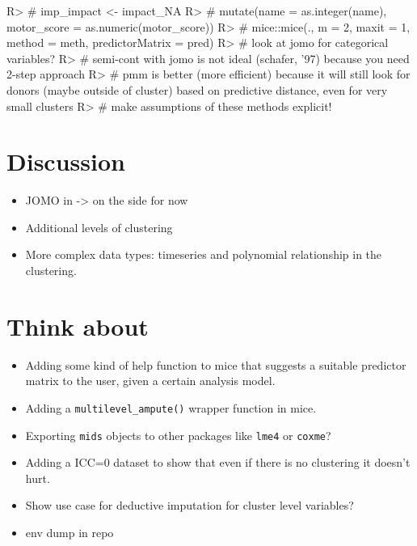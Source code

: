 \documentclass[
]{jss}
\begin{document}
\begin{CodeChunk}
\begin{CodeInput}
R> # imp_impact <- impact_NA %
R> #   mutate(name = as.integer(name), motor_score = as.numeric(motor_score)) %
R> #   mice::mice(., m = 2, maxit = 1, method = meth, predictorMatrix = pred)
R> # look at jomo for categorical variables?
R> # semi-cont with jomo is not ideal (schafer, '97) because you need 2-step approach
R> # pmm is better (more efficient) because it will still look for donors (maybe outside of cluster) based on predictive distance, even for very small clusters
R> # make assumptions of these methods explicit!
\end{CodeInput}
\end{CodeChunk}

\hypertarget{discussion}{%
\section{Discussion}\label{discussion}}

\begin{itemize}
\item
  JOMO in  -\textgreater{} on the side for now
\item
  Additional levels of clustering
\item
  More complex data types: timeseries and polynomial relationship in the
  clustering.
\end{itemize}

\hypertarget{think-about}{%
\section{Think about}\label{think-about}}

\begin{itemize}
\item
  Adding some kind of help function to mice that suggests a suitable
  predictor matrix to the user, given a certain analysis model.
\item
  Adding a \texttt{multilevel\_ampute()} wrapper function in mice.
\item
  Exporting \texttt{mids} objects to other packages like \texttt{lme4}
  or \texttt{coxme}?
\item
  Adding a ICC=0 dataset to show that even if there is no clustering it
  doesn't hurt.
\item
  Show use case for deductive imputation for cluster level variables?
\item
  env dump in repo
\end{itemize}

\renewcommand\refname{References}

\end{document}
